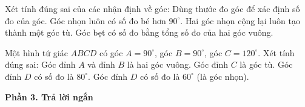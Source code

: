 \begin{ex} %
Xét tính đúng sai của các nhận định về góc:
\choiceTF
{\True Dùng thước đo góc để xác định số đo của góc.}
{\True Góc nhọn luôn có số đo bé hơn $90^\circ$.}
{Hai góc nhọn cộng lại luôn tạo thành một góc tù.}
{\True Góc bẹt có số đo bằng tổng số đo của hai góc vuông.}
\end{ex}

\begin{ex} %
Một hình tứ giác $ABCD$ có góc $A = 90^\circ$, góc $B = 90^\circ$, góc $C = 120^\circ$. Xét tính đúng sai:
\choiceTF
{\True Góc đỉnh $A$ và đỉnh $B$ là hai góc vuông.}
{\True Góc đỉnh $C$ là góc tù.}
{Góc đỉnh $D$ có số đo là $80^\circ$.}
{\True Góc đỉnh $D$ có số đo là $60^\circ$ (là góc nhọn).}
\end{ex}

\textbf{Phần 3. Trả lời ngắn}

